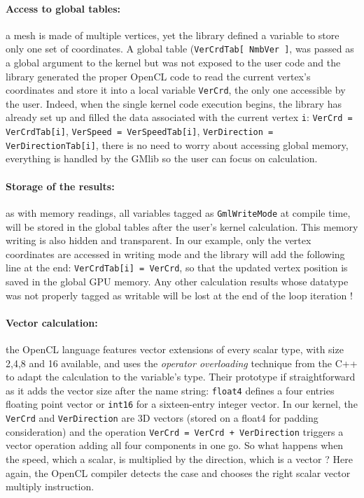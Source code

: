 \documentclass[a4paper,12pt]{article}
\begin{document}
\paragraph{Access to global tables:} a mesh is made of multiple vertices, yet the library defined a variable to store only one set of coordinates. A global table ({\tt VerCrdTab[ NmbVer ]}, was passed as a global argument to the kernel but was not exposed to the user code and the library generated the proper OpenCL code to read the current vertex's coordinates and store it into a local variable {\tt VerCrd}, the only one accessible by the user. Indeed, when the single kernel code execution begins, the library has already set up and filled the data associated with the current vertex {\tt i}: {\tt VerCrd = VerCrdTab[i]}, {\tt VerSpeed = VerSpeedTab[i]}, {\tt VerDirection = VerDirectionTab[i]}, there is no need to worry about accessing global memory, everything is handled by the GMlib so the user can focus on calculation.

\paragraph{Storage of the results:} as with memory readings, all variables tagged as {\tt GmlWriteMode} at compile time, will be stored in the global tables after the user's kernel calculation. This memory writing is also hidden and transparent. In our example, only the vertex coordinates are accessed in writing mode and the library will add the following line at the end: {\tt VerCrdTab[i] = VerCrd}, so that the updated vertex position is saved in the global GPU memory. Any other calculation results whose datatype was not properly tagged as writable will be lost at the end of the loop iteration !

\paragraph{Vector calculation:} the OpenCL language features vector extensions of every scalar type, with size 2,4,8 and 16 available, and uses the \emph{operator overloading} technique from the C++ to adapt the calculation to the variable's type. Their prototype if straightforward as it adds the vector size after the name string: {\tt float4} defines a four entries floating point vector or {\tt int16} for a sixteen-entry integer vector. In our kernel, the {\tt VerCrd} and {\tt VerDirection} are 3D vectors (stored on a float4 for padding consideration) and the operation {\tt VerCrd = VerCrd + VerDirection} triggers a vector operation adding all four components in one go. So what happens when the speed, which a scalar, is multiplied by the direction, which is a vector ? Here again, the OpenCL compiler detects the case and chooses the right scalar vector multiply instruction.
\end{document}
